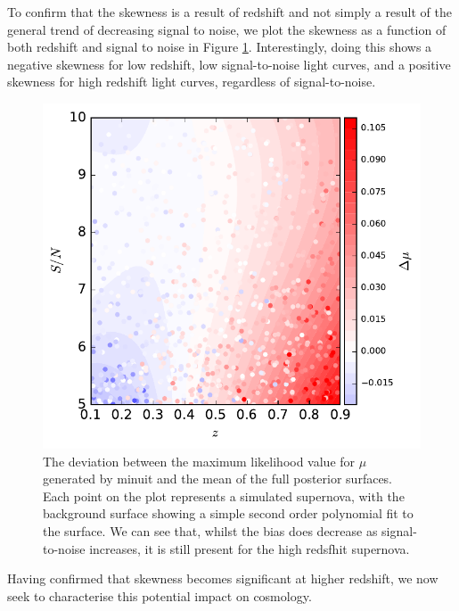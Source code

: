 \documentclass[a4paper,fleqn,usenatbib]{mnras}
\begin{document}
To confirm that the skewness is a result of redshift and not simply a result of the general trend of decreasing signal to noise, we plot the skewness as a function of both redshift and signal to noise in Figure \ref{fig:bias_skew}. Interestingly, doing this shows a negative skewness for low redshift, low signal-to-noise light curves, and a positive skewness for high redshift light curves, regardless of signal-to-noise.
\begin{figure}
	\includegraphics[width=\columnwidth]{../output/bias.pdf}
	\caption{The deviation between the maximum likelihood value for $\mu$ generated by minuit and the mean of the full posterior surfaces. Each point on the plot represents a simulated supernova, with the background surface showing a simple second order polynomial fit to the surface. We can see that, whilst the bias does decrease as signal-to-noise increases, it is still present for the high redsfhit supernova.}
	\label{fig:bias_skew}
\end{figure}
Having confirmed that skewness becomes significant at higher redshift, we now seek to characterise this potential impact on cosmology.
\end{document}
